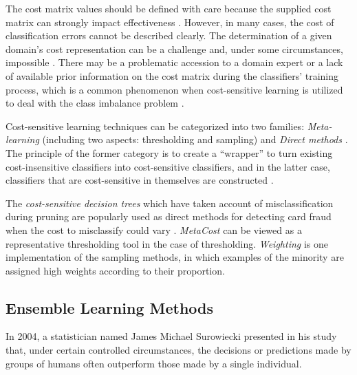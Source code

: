 The cost matrix values should be defined with care because the supplied cost matrix can strongly impact effectiveness \cite{10}. However, in many cases, the cost of classification errors cannot be described clearly. The determination of a given domain's cost representation can be a challenge and, under some circumstances, impossible \cite{17}. There may be a problematic accession to a domain expert or a lack of available prior information on the cost matrix during the classifiers' training process, which is a common phenomenon when cost-sensitive learning is utilized to deal with the class imbalance problem \cite{10}. 

Cost-sensitive learning techniques can be categorized into two families: \textit{Meta-learning} (including two aspects: thresholding and sampling) and \textit{Direct methods} \cite{20}. The principle of the former category is to create a ``wrapper'' to turn existing cost-insensitive classifiers into cost-sensitive classifiers, and in the latter case, classifiers that are cost-sensitive in themselves are constructed \cite{20}. 

The \textit{cost-sensitive decision trees} which have taken account of misclassification during pruning are popularly used as direct methods for detecting card fraud when the cost to misclassify could vary \cite{20,22}. \textit{MetaCost} \cite{23} can be viewed as a representative thresholding tool in the case of thresholding. \textit{Weighting} \cite{24} is one implementation of the sampling methods, in which examples of the minority are assigned high weights according to their proportion.

\subsection{Ensemble Learning Methods}
In 2004, a statistician named James Michael Surowiecki presented in his study \cite{34} that, under certain controlled circumstances, the decisions or predictions made by groups of humans often outperform those made by a single individual. 

